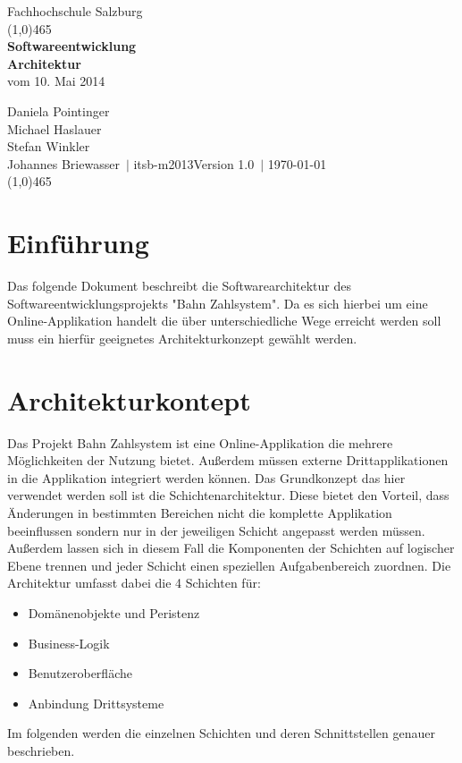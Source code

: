 \documentclass[a4paper,12pt]{article} %
\author{\theauthor\\\company}
\date{\thedate}
\title{\thetitle}
\def \theauthor  {Daniela Pointinger\\Michael Haslauer\\Stefan Winkler\\Johannes Briewasser}
\def \thedate    {\today}
\def \thetitle   {Softwareentwicklung\\Architektur}
\def \subtitle   {vom 10. Mai 2014}
\def \company    {Fachhochschule Salzburg}
\def \department {itsb-m2013}
\def \version    {1.0}
\begin{document}
\begin{titlepage}
\begin{center}
\Large\company\tiny\\
\textcolor{titlepagelinecolor}{\line(1,0){465}\\[1cm]}
\huge
\textbf{\thetitle}\\
\Large \subtitle\\[1cm]
\end{center}
\large
\theauthor\ $\mid$ \department\hfill Version \version\ $\mid$ \thedate\\[1cm]
\textcolor{titlepagelinecolor}{\line(1,0){465}\\[1cm]}
\end{titlepage}

\tableofcontents %

\newpage


\section{Einführung}
Das folgende Dokument beschreibt die Softwarearchitektur des Softwareentwicklungsprojekts "Bahn Zahlsystem". Da es sich hierbei um eine Online-Applikation handelt die über unterschiedliche Wege erreicht werden soll muss ein hierfür geeignetes Architekturkonzept gewählt werden.

\section{Architekturkontept}
Das Projekt \glqq{}Bahn Zahlsystem\grqq{} ist eine Online-Applikation die mehrere Möglichkeiten der Nutzung bietet. Außerdem müssen externe Drittapplikationen in die Applikation integriert werden können. Das Grundkonzept das hier verwendet werden soll ist die Schichtenarchitektur. Diese bietet den Vorteil, dass Änderungen in bestimmten Bereichen nicht die komplette Applikation beeinflussen sondern nur in der jeweiligen Schicht angepasst werden müssen. Außerdem lassen sich in diesem Fall die Komponenten der Schichten auf logischer Ebene trennen und jeder Schicht einen speziellen Aufgabenbereich zuordnen. Die Architektur umfasst dabei die 4 Schichten für:
\begin{itemize}\itemsep2pt
 \item Domänenobjekte und Peristenz
 \item Business-Logik
 \item Benutzeroberfläche
 \item Anbindung Drittsysteme
\end{itemize}
Im folgenden werden die einzelnen Schichten und deren Schnittstellen genauer beschrieben.
\end{document}
